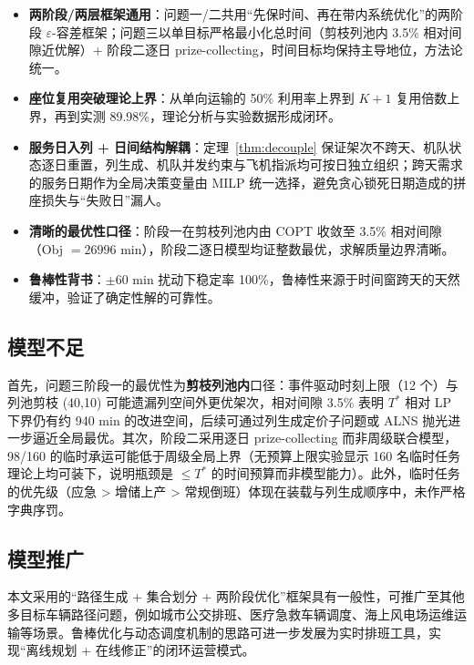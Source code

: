 \documentclass[withoutpreface]{cumcmthesis}
\begin{document}
\begin{itemize}
\item \textbf{两阶段/两层框架通用}：问题一/二共用``先保时间、再在带内系统优化''的两阶段 $\varepsilon$-容差框架；问题三以单目标严格最小化总时间（剪枝列池内 3.5\% 相对间隙近优解）+ 阶段二逐日 prize-collecting，时间目标均保持主导地位，方法论统一。
\item \textbf{座位复用突破理论上界}：从单向运输的 50\% 利用率上界到 $K+1$ 复用倍数上界，再到实测 89.98\%，理论分析与实验数据形成闭环。
\item \textbf{服务日入列 + 日间结构解耦}：定理~\ref{thm:decouple} 保证架次不跨天、机队状态逐日重置，列生成、机队并发约束与飞机指派均可按日独立组织；跨天需求的服务日期作为全局决策变量由 MILP 统一选择，避免贪心锁死日期造成的拼座损失与``失败日''漏人。
\item \textbf{清晰的最优性口径}：阶段一在剪枝列池内由 COPT 收敛至 3.5\% 相对间隙（Obj $= 26996$ min），阶段二逐日模型均证整数最优，求解质量边界清晰。
\item \textbf{鲁棒性背书}：$\pm$60 min 扰动下稳定率 100\%，鲁棒性来源于时间窗跨天的天然缓冲，验证了确定性解的可靠性。
\end{itemize}

\subsection{模型不足}

首先，问题三阶段一的最优性为\textbf{剪枝列池内}口径：事件驱动时刻上限（12 个）与列池剪枝 (40,10) 可能遗漏列空间外更优架次，相对间隙 3.5\% 表明 $T^*$ 相对 LP 下界仍有约 940 min 的改进空间，后续可通过列生成定价子问题或 ALNS 抛光进一步逼近全局最优。其次，阶段二采用逐日 prize-collecting 而非周级联合模型，98/160 的临时承运可能低于周级全局上界（无预算上限实验显示 160 名临时任务理论上均可装下，说明瓶颈是 $\leq T^*$ 的时间预算而非模型能力）。此外，临时任务的优先级（应急 > 增储上产 > 常规倒班）体现在装载与列生成顺序中，未作严格字典序罚。

\subsection{模型推广}

本文采用的“路径生成 + 集合划分 + 两阶段优化”框架\cite{si2017}具有一般性，可推广至其他多目标车辆路径问题，例如城市公交排班、医疗急救车辆调度、海上风电场运维运输等场景。鲁棒优化与动态调度机制的思路可进一步发展为实时排班工具，实现“离线规划 + 在线修正”的闭环运营模式。

\end{document}
